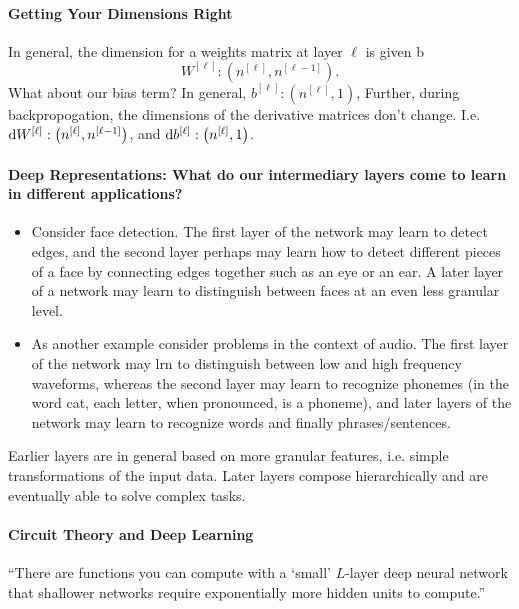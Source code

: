 \documentclass[12pt]{article}
\begin{document}
\paragraph{Getting Your Dimensions Right} In general, the dimension for a weights matrix at layer $\ell$ is given b
\begin{equation}   W^{[\ell]} : \left( n^{[\ell]}, n^{[\ell - 1]} \right). \end{equation}
What about our bias term? In general, $b^{[\ell]} : \left(n^{[\ell]}, 1\right)$, Further, during backpropogation, the dimensions of the derivative matrices don't change. I.e. 
$\operatorname{d}\!{W}^{[\ell]} : \left( n^{[\ell]}, n^{[\ell - 1]} \right)$, and $\operatorname{d}\!{b}^{[\ell]} : \left(n^{[\ell]}, 1\right)$.

\paragraph{Deep Representations:
\small What do our intermediary layers come to learn in different applications?}
\begin{itemize} \item Consider face detection. The first layer of the network may learn to detect edges, and the second layer perhaps may learn how to detect different pieces of a face by connecting edges together such as an eye or an ear. A later layer of a network may learn to distinguish between faces at an even less granular level.

\item As another example consider problems in the context of audio. The first layer of the network may lrn to distinguish between low and high frequency waveforms, whereas the second layer may learn to recognize phonemes (in the word cat, each letter, when pronounced, is a phoneme), and later layers of the network may learn to recognize words and finally phrases/sentences.
\end{itemize}
Earlier layers are in general based on more granular features, i.e. simple transformations of the input data. Later layers compose hierarchically and are eventually able to solve complex tasks.   
\paragraph{Circuit Theory and Deep Learning}
``There are functions you can compute with a `small' $L$-layer deep neural network that shallower networks require exponentially more hidden units to compute.''
\end{document}

